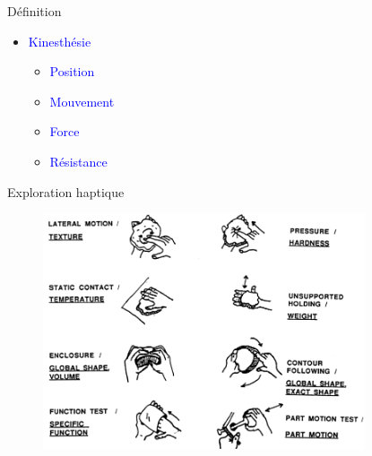 {\begin{frame}{Définition}
\begin{multicols}{3}
\begin{itemize}
\item \textcolor{blue}{Kinesthésie}
\begin{itemize}
\setlength\itemsep{-0.2em}
\item \textcolor{blue}{Position}
\item \textcolor{blue}{Mouvement}
\item \textcolor{blue}{Force}
\item \textcolor{blue}{Résistance}
\end{itemize}
\end{itemize}

\end{multicols}	
	
\end{frame}
}

{
\begin{frame}{Exploration haptique}
\begin{figure}
\includegraphics[width=9.5cm]{images/hapticExploration}
\end{figure}
\end{frame}
}

